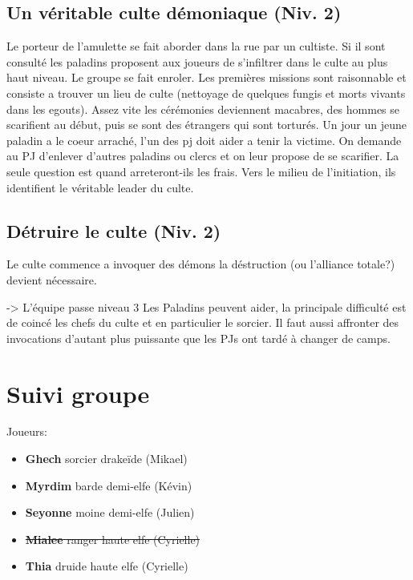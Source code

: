 \subsection{Un véritable culte démoniaque (Niv. 2)}

Le porteur de l'amulette se fait aborder dans la rue par un cultiste. Si il sont consulté les paladins
proposent aux joueurs de s'infiltrer dans le culte au plus haut niveau. Le groupe se fait enroler. 
Les premières missions sont raisonnable et consiste a trouver un lieu de culte (nettoyage de quelques
fungis et morts vivants dans les egouts). Assez vite les cérémonies deviennent macabres, des hommes se 
scarifient au début, puis se sont des étrangers qui sont torturés. Un jour un jeune paladin a le coeur 
arraché, l'un des pj doit aider a tenir la victime. On demande au PJ d'enlever d'autres paladins ou
clercs et on leur propose de se scarifier. La seule question est quand arreteront-ils les frais. Vers le 
milieu de l'initiation, ils identifient le véritable leader du culte.

\subsection{Détruire le culte (Niv. 2)}

Le culte commence a invoquer des démons la déstruction (ou l'alliance totale?) devient nécessaire.

 -> L'équipe passe niveau 3
Les Paladins peuvent aider, la principale difficulté est de coincé les chefs du culte et en particulier
le sorcier. Il faut aussi affronter des invocations d'autant plus puissante que les PJs ont tardé à changer
de camps. 



\section{Suivi groupe}

Joueurs:
\begin{itemize}
  \item {\bf Ghech} sorcier drakeïde (Mikael)
  \item {\bf Myrdim} barde demi-elfe (Kévin)
  \item {\bf Seyonne} moine demi-elfe (Julien)
  \item \sout{{\bf Mialee} ranger haute elfe (Cyrielle)}
  \item {\bf Thia} druide haute elfe (Cyrielle)
\end{itemize}

